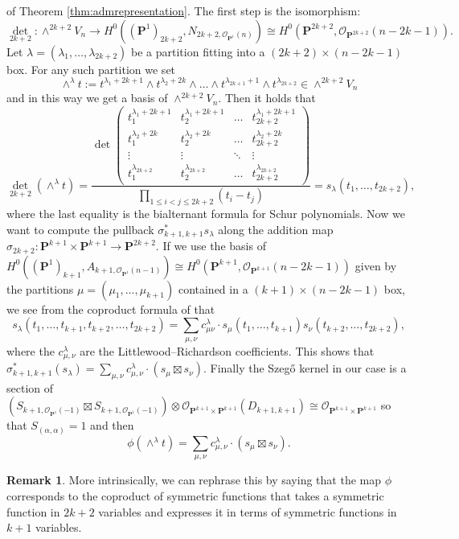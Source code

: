 \documentclass[12pt]{amsart}
\newcounter{thmcounter}
\numberwithin{equation}{section}
\numberwithin{thmcounter}{section}
\theoremstyle{definition}
\newtheorem{remark}[thmcounter]{Remark}
\theoremstyle{claim}
\newcommand{\nP}{\mathbf{P}}
\newcommand{\sO}{\mathscr{O}}
\begin{document}
	of Theorem \ref{thm:admrepresentation}. The first step is the isomorphism:
	\[ {\det}_{2k+2}\colon \wedge^{2k+2}V_n \longrightarrow H^0((\nP^1)_{2k+2},N_{2k+2,\sO_{\nP^1}(n)}) \cong H^0(\nP^{2k+2},\sO_{\nP^{2k+2}}(n-2k-1)) . \]
	Let $\lambda=(\lambda_1,\dots,\lambda_{2k+2})$ be a partition fitting into a $(2k+2)\times (n-2k-1)$ box. For any such partition we set
	\[  \wedge^{\lambda}t := t^{\lambda_1+2k+1}\wedge t^{\lambda_2+2k} \wedge \dots \wedge t^{\lambda_{2k+1}+1} \wedge t^{\lambda_{2k+2}} \in \wedge^{2k+2}V_n\]
	and in this way we get a basis of $\wedge^{2k+2}V_n$. Then it holds that
	\[ {\det}_{2k+2}(\wedge^{\lambda}t) = \frac{\det
		\begin{pmatrix}
			t_1^{\lambda_1+2k+1} & t_2^{\lambda_1+2k+1} & \dots & t_{2k+2}^{\lambda_1+2k+1} \\
			t_1^{\lambda_2+2k} & t_2^{\lambda_2+2k} & \dots & t_{2k+2}^{\lambda_2+2k} \\
			\vdots & \vdots & \ddots & \vdots  \\
			t_1^{\lambda_{2k+2}} & t_2^{\lambda_{2k+2}} & \dots & t_{2k+2}^{\lambda_{2k+2}}
	\end{pmatrix}}{\prod_{1\leq i < j \leq 2k+2}(t_i-t_j)}  = s_{\lambda}(t_1,\dots,t_{2k+2}),
	\]
	where the last equality is the bialternant formula for Schur polynomials. Now we want to compute the pullback $\sigma_{k+1,k+1}^*s_{\lambda}$ along the addition map $\sigma_{2k+2}\colon \nP^{k+1} \times \nP^{k+1} \longrightarrow \nP^{2k+2}$. If we use the basis of $H^0((\nP^1)_{k+1},A_{k+1,\sO_{\nP^1}(n-1)}) \cong H^0(\nP^{k+1},\sO_{\nP^{k+1}}(n-2k-1))$ given by the partitions $\mu = (\mu_1,\dots,\mu_{k+1})$ contained in a $(k+1)\times (n-2k-1)$ box, we see from the coproduct formula of \cite[Formula (5.9), page 72]{macdonald} that
	\[ s_{\lambda}(t_1,\dots,t_{k+1},t_{k+2},\dots,t_{2k+2}) = \sum_{\mu,\nu} c^{\lambda}_{\mu\nu} \cdot s_{\mu}(t_1,\dots,t_{k+1})s_{\nu}(t_{k+2},\dots,t_{2k+2}),\]
	where the $c^{\lambda}_{\mu,\nu}$ are the Littlewood--Richardson coefficients. This shows that $\sigma_{k+1,k+1}^*(s_{\lambda}) = \sum_{\mu,\nu} c^{\lambda}_{\mu,\nu}\cdot ( s_{\mu}\boxtimes s_{\nu})$. Finally the Szeg\H{o} kernel in our case is a section of $(S_{k+1,\sO_{\nP^1}(-1)}\boxtimes S_{k+1,\sO_{\nP^1}(-1)}) \otimes \sO_{\nP^{k+1} \times \nP^{k+1}}(D_{k+1,k+1}) \cong \sO_{\nP^{k+1}\times \nP^{k+1}}$ so that $S_{(\alpha,\alpha)}=1$ and then
	\[ \phi(\wedge^{\lambda}t) = \sum_{\mu,\nu} c^{\lambda}_{\mu,\nu} \cdot (s_{\mu}\boxtimes s_{\nu}). \]
	
	\begin{remark}\label{rmk:coproduct}
	More intrinsically, we can rephrase this by saying that the map $\phi$ corresponds to the coproduct of symmetric functions that takes a symmetric function in $2k+2$ variables and expresses it in terms of symmetric functions in $k+1$ variables.
	\end{remark}
	
\end{document}
